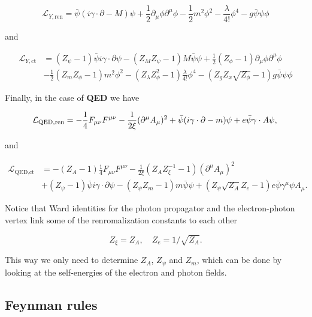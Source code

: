 \documentclass[../FeynCalcManual.tex]{subfiles}
\begin{document}
\begin{equation}
\mathcal{L}_{Y,{\textrm{ren}}} = \bar{\psi} (i \gamma \cdot \partial - M) \psi + \frac{1}{2} \partial_\mu \phi \partial^\mu \phi - \frac{1}{2} m^2 \phi^2 - \frac{\lambda}{4!} \phi^4 - g \bar{\psi} \psi \phi
\end{equation}

and

\begin{align*}
\mathcal{L}_{Y,{\textrm{ct}}} &= (Z_\psi - 1) \bar{\psi} i \gamma \cdot \partial \psi - (Z_M Z_\psi - 1) M \bar{\psi} \psi + \frac{1}{2} (Z_\phi - 1) \partial_\mu \phi \partial^\mu \phi \\
&- \frac{1}{2} (Z_m Z_\phi -1) m^2 \phi^2 -  (Z_\lambda Z_\phi^2 -1) \frac{\lambda}{4!} \phi^4 - (Z_g Z_x \sqrt{Z_\phi} -1) g \bar{\psi} \psi \phi
\end{align*}

Finally, in the case of \textbf{QED} we have

\begin{equation}
  \mathcal{L}_{\textrm{QED},\textrm{ren}} = -\frac{1}{4} F_{\mu \nu}F^{\mu \nu} - \frac{1}{2 \xi}(\partial^\mu A_\mu)^2 +
  \bar{\psi} (i \gamma \cdot \partial -m) \psi + e  \bar{\psi} \gamma \cdot A \psi ,\\
\end{equation}

and

\begin{align*}
  \mathcal{L}_{\textrm{QED},\textrm{ct}}  & = - (Z_A-1) \frac{1}{4}F_{\mu \nu}F^{\mu \nu} - \frac{1}{2\xi} (Z_A Z^{-1}_\xi - 1) (\partial^\mu A_\mu)^2 \nonumber \\
    & + (Z_\psi-1) \bar{\psi} i \gamma \cdot \partial \psi- (Z_\psi Z_m -1) m \bar{\psi} \psi + (Z_\psi \sqrt{Z_A} Z_e -1) e \bar{\psi} \gamma^\mu \psi A_\mu.
\end{align*}

Notice that Ward identities for the photon propagator and the
electron-photon vertex link some of the renromalization constants to
each other

\begin{equation}
Z_\xi = Z_A, \quad Z_e = 1/\sqrt{Z_A}.
\end{equation}

This way we only need to determine \(Z_A\), \(Z_\psi\) and \(Z_m\),
which can be done by looking at the self-energies of the electron and
photon fields.

\subsection{Feynman rules}\label{feynman-rules}
\end{document}
